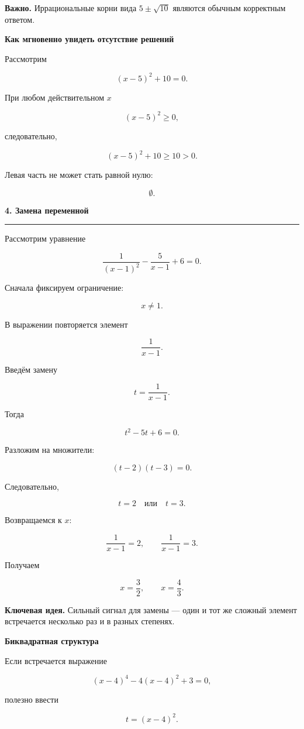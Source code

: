 \documentclass[a4paper,12pt]{article}
\newcommand{\topic}[1]{%
    \vspace{0.5em}
    {\Large\bfseries\textcolor{darkaccent}{#1}}\par
    \vspace{0.2em}
    {\color{accent}\rule{\linewidth}{0.7pt}}
    \vspace{0.5em}
}
\newcommand{\subtopic}[1]{%
    \vspace{0.5em}
    {\large\bfseries\textcolor{darkaccent}{#1}}\par
}
\newcommand{\keyidea}[1]{%
    \par\smallskip
    \textbf{\textcolor{darkaccent}{Ключевая идея.}} #1
    \par\smallskip
}
\newcommand{\warning}[1]{%
    \par\smallskip
    \textbf{\textcolor{accent}{Важно.}} #1
    \par\smallskip
}
\begin{document}
\warning{
Иррациональные корни вида \(5\pm\sqrt{10}\) являются обычным корректным ответом.
}

\subtopic{Как мгновенно увидеть отсутствие решений}

Рассмотрим

\[
(x-5)^2+10=0.
\]

При любом действительном \(x\)

\[
(x-5)^2\ge 0,
\]

следовательно,

\[
(x-5)^2+10\ge 10>0.
\]

Левая часть не может стать равной нулю:

\[
\boxed{\emptyset}.
\]


\topic{4. Замена переменной}

Рассмотрим уравнение

\[
\frac{1}{(x-1)^2}
-\frac{5}{x-1}
+6=0.
\]

Сначала фиксируем ограничение:

\[
x\ne1.
\]

В выражении повторяется элемент

\[
\frac{1}{x-1}.
\]

Введём замену

\[
t=\frac{1}{x-1}.
\]

Тогда

\[
t^2-5t+6=0.
\]

Разложим на множители:

\[
(t-2)(t-3)=0.
\]

Следовательно,

\[
t=2
\quad\text{или}\quad
t=3.
\]

Возвращаемся к \(x\):

\[
\frac{1}{x-1}=2,
\qquad
\frac{1}{x-1}=3.
\]

Получаем

\[
x=\frac32,
\qquad
x=\frac43.
\]

\keyidea{
Сильный сигнал для замены --- один и тот же сложный элемент встречается несколько раз и в разных степенях.
}

\subtopic{Биквадратная структура}

Если встречается выражение

\[
(x-4)^4-4(x-4)^2+3=0,
\]

полезно ввести

\[
t=(x-4)^2.
\]
\end{document}
